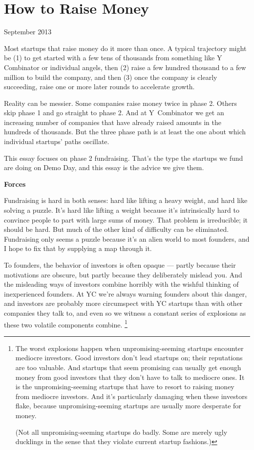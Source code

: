 \documentclass[12pt]{book}
\begin{document}
\chapter{How to Raise Money}

September 2013

Most startups that raise money do it more than once. A typical
trajectory might be (1) to get started with a few tens of thousands from
something like Y Combinator or individual angels, then (2) raise a few
hundred thousand to a few million to build the company, and then (3)
once the company is clearly succeeding, raise one or more later rounds
to accelerate growth.

Reality can be messier. Some companies raise money twice in phase 2.
Others skip phase 1 and go straight to phase 2. And at Y~Combinator we
get an increasing number of companies that have already raised amounts
in the hundreds of thousands. But the three phase path is at least the
one about which individual startups' paths oscillate.

This essay focuses on phase 2 fundraising. That's the type the startups
we fund are doing on Demo Day, and this essay is the advice we give
them.

\textbf{Forces}

Fundraising is hard in both senses: hard like lifting a heavy weight,
and hard like solving a puzzle. It's hard like lifting a weight because
it's intrinsically hard to convince people to part with large sums of
money. That problem is irreducible; it should be hard. But much of the
other kind of difficulty can be eliminated. Fundraising only seems a
puzzle because it's an alien world to most founders, and I hope to fix
that by supplying a map through it.

To founders, the behavior of investors is often opaque --- partly
because their motivations are obscure, but partly because they
deliberately mislead you. And the misleading ways of investors combine
horribly with the wishful thinking of inexperienced founders. At YC
we're always warning founders about this danger, and investors are
probably more circumspect with YC startups than with other companies
they talk to, and even so we witness a constant series of explosions as
these two volatile components combine. \footnote{The worst explosions happen when unpromising-seeming startups
encounter mediocre investors. Good investors don't lead startups on;
their reputations are too valuable. And startups that seem promising can
usually get enough money from good investors that they don't have to
talk to mediocre ones. It is the unpromising-seeming startups that have
to resort to raising money from mediocre investors. And it's
particularly damaging when these investors flake, because
unpromising-seeming startups are usually more desperate for money.

(Not all unpromising-seeming startups do badly. Some are merely ugly
ducklings in the sense that they violate current startup fashions.)}
\end{document}

